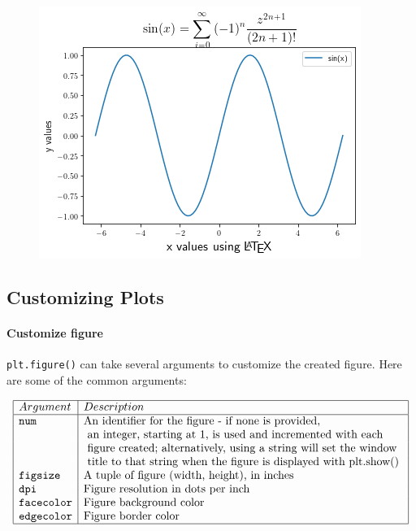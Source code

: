 \documentclass[11pt]{article}
\begin{document}
\begin{figure}
\centering
\includegraphics[scale=0.6]{Latex.png}
\end{figure}

\hypertarget{customizing-plots}{%
\subsection{Customizing Plots}\label{customizing-plots}}

\hypertarget{customize-figure}{%
\paragraph{Customize figure}\label{customize-figure}}

\texttt{plt.figure()} can take several arguments to customize the
created figure. Here are some of the common arguments:

$$\begin{array}{|l|l|}
\hline
  Argument&Description\\
\hline
\texttt{num} &\text{An identifier for the figure - if none is provided,}\\
&\text{ an integer, starting at 1, is used and incremented with each}\\
&\text{ figure created; alternatively, using a string will set the window}\\
&\text{ title to that string when the figure is displayed with plt.show() }\\
\texttt{figsize} &\text{A tuple of figure (width, height), in inches }\\
\texttt{dpi} &\text{Figure resolution in dots per inch }\\
\texttt{facecolor} &\text{Figure background color }\\
\texttt{edgecolor} &\text{Figure border color }\\
\hline
\end{array}$$
\end{document}
